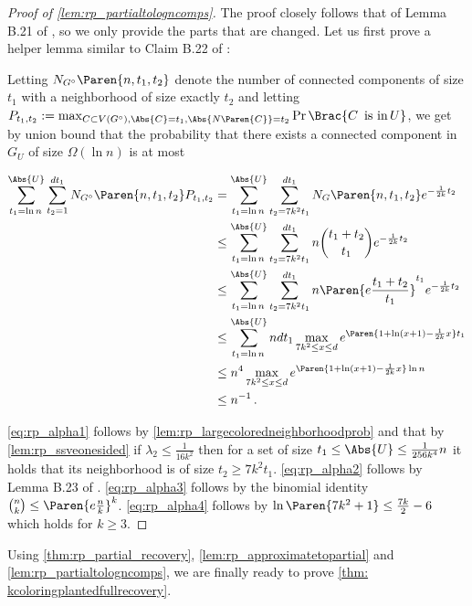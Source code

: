 \begin{proof}[Proof of \cref{lem:rp_partialtologncomps}]
The proof closely follows that of Lemma B.21 of \cite{MR3536556-David16}, so we only provide the parts that are changed. Let us first prove a helper lemma similar to Claim B.22 of \cite{MR3536556-David16}:

Letting $N_{G^{\circ}}\Paren{n,t_1,t_2}$ denote the number of connected components of size $t_1$ with a neighborhood of size exactly $t_2$ and letting $P_{t_1,t_2}:=\max_{C\subset V(G^{\circ}),\Abs{C}=t_1,\Abs{N\Paren{C}}=t_2}\Pr\Brac{\text{\ensuremath{C}\,\ is in\,\ensuremath{U}}}$, we get by union bound that the probability that there exists a connected component in $G_{U}$ of size $\Omega(\ln n)$ is at most

    \begin{align}
        \sum_{t_1=\ln n\,}^{\Abs{U}}\sum_{t_2=1}^{d t_1}N_{G^{\circ}}\Paren{n,t_1,t_2}P_{t_1,t_2} & =\sum_{t_1=\ln n\,}^{\Abs{U}}\sum_{t_2= 7k^2t_1 }^{d t_1}N_{G}\Paren{n,t_1,t_2}e^{-\frac{1}{2k} t_2}\label{eq:rp_alpha1}\\
        & \le\sum_{t_1=\ln n\,}^{\Abs{U}}\sum_{t_2= 7k^2t_1 }^{d t_1}n\binom{t_1+t_2 }{ t_1}e^{-\frac{1}{2k} t_2}\label{eq:rp_alpha2}\\
        & \le\sum_{t_1=\ln n\,}^{\Abs{U}}\sum_{t_2= 7k^2t_1 }^{d t_1}n\Paren{e\frac{t_1+t_2}{t_1}}^{t_1}e^{-\frac{1}{2k} t_2}\label{eq:rp_alpha3}\\
        & \le\sum_{t_1=\ln n\,}^{\Abs{U}}ndt_1\max_{7k^2\le x\le d}e^{\Paren{1+\ln(x+1)-\frac{1}{2k} x}t_1}\nonumber \\
        & \le n^{4}\max_{7k^2\le x\le d}e^{\Paren{1+\ln(x+1)-\frac{1}{2k} x}\ln{n}}\nonumber\\
        & \le n^{-1}\,.\label{eq:rp_alpha4}
    \end{align}

    \cref{eq:rp_alpha1} follows by \cref{lem:rp_largecoloredneighborhoodprob} and that by \cref{lem:rp_ssveonesided} if $\lambda_2\le \frac{1}{16k^2}$ then for a set of size $t_1\le\Abs{U}\le\frac{1}{256k^4}n$ it holds that its neighborhood is of size $t_2\ge7k^2t_1$.
    \cref{eq:rp_alpha2} follows by Lemma B.23 of \cite{MR3536556-David16}.
    \cref{eq:rp_alpha3} follows by the binomial identity ${n \choose k}\le\Paren{e\frac{n}{k}}^{k}$.
    \cref{eq:rp_alpha4} follows by $\ln\Paren{7k^2+1}\leq \frac{7k}{2}-6$ which holds for $k\geq 3$.
\end{proof}

Using \cref{thm:rp_partial_recovery}, \cref{lem:rp_approximatetopartial} and \cref{lem:rp_partialtologncomps}, we are finally ready to prove \cref{thm: kcoloringplantedfullrecovery}.

